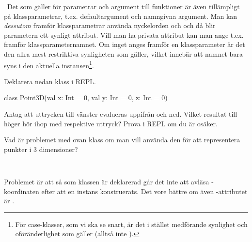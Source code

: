 \QUESTEND




\QUESTBEGIN

\Task \what~Det som gäller för parametrar och argument till funktioner är även tillämpligt på klassparametrar, t.ex. defaultargument och namngivna argument. Man kan \emph{dessutom} framför klassparametrar använda nyckelorden  och  och då blir parametern ett synligt attribut. Vill man ha privata attribut kan man ange t.ex.  framför klassparameternamnet.
Om inget anges framför en klassparameter är det den allra mest restriktiva synligheten  som gäller, vilket innebär att namnet bara syns i den aktuella instansen\footnote{För case-klasser, som vi ska se snart, är det i stället  medförande synlighet och oföränderlighet som gäller (alltså inte ).}.

Deklarera nedan klass i REPL.

\begin{Code}
class Point3D(val x: Int = 0, val y: Int = 0, z: Int = 0)
\end{Code}

\Subtask Antag att uttrycken till vänster evalueras uppifrån och ned. Vilket resultat till höger hör ihop med respektive uttryck? Prova i REPL om du är osäker.

\begin{ConceptConnections}

\end{ConceptConnections}

\Subtask Vad är problemet med ovan klass om man vill använda den för att representera punkter i 3 dimensioner?

\SOLUTION

\TaskSolved \what~

\SubtaskSolved

\begin{ConceptConnections}

\end{ConceptConnections}

\SubtaskSolved Problemet är att så som klassen  är deklarerad går det inte att avläsa -koordinaten efter att en instans konstruerats. Det vore bättre om även -attributet är .

\QUESTEND




